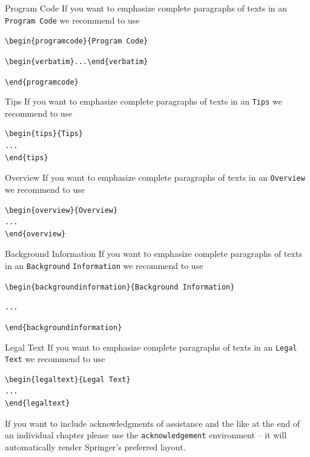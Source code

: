 \begin{programcode}{Program Code}
If you want to emphasize complete paragraphs of texts in an \verb|Program Code| we recommend to
use

\verb|\begin{programcode}{Program Code}|

\verb|\begin{verbatim}...\end{verbatim}|

\verb|\end{programcode}|

\end{programcode}
%
\begin{tips}{Tips}
If you want to emphasize complete paragraphs of texts in an \verb|Tips| we recommend to
use  \begin{verbatim}\begin{tips}{Tips}
...
\end{tips}\end{verbatim}
\end{tips}
%
%
\begin{overview}{Overview}
If you want to emphasize complete paragraphs of texts in an \verb|Overview| we recommend to
use  \begin{verbatim}\begin{overview}{Overview}
...
\end{overview}\end{verbatim}
\end{overview}
\clearpage
\begin{backgroundinformation}{Background Information}
If you want to emphasize complete paragraphs of texts in an \verb|Background|
\verb|Information| we recommend to
use

\verb|\begin{backgroundinformation}{Background Information}|

\verb|...|

\verb|\end{backgroundinformation}|
\end{backgroundinformation}
\begin{legaltext}{Legal Text}
If you want to emphasize complete paragraphs of texts in an \verb|Legal Text| we recommend to
use  \begin{verbatim}\begin{legaltext}{Legal Text}
...
\end{legaltext}\end{verbatim}
\end{legaltext}
%
\begin{acknowledgement}
If you want to include acknowledgments of assistance and the like at the end of an individual chapter please use the \verb|acknowledgement| environment -- it will automatically render Springer's preferred layout.
\end{acknowledgement}
%
